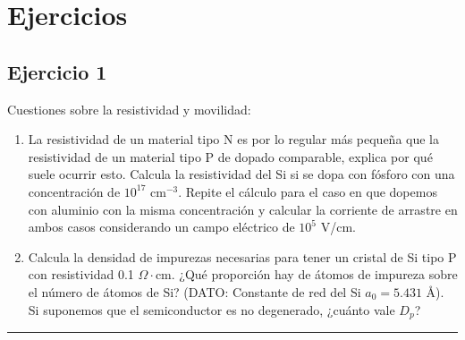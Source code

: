 \newpage




\section{Ejercicios}

\subsection{Ejercicio 1}

Cuestiones sobre la resistividad y movilidad:
\begin{enumerate}[label=\alph*)]
	\item La resistividad de un material tipo N es por lo regular más pequeña que la resistividad de un material tipo P de dopado comparable, explica por qué suele ocurrir esto. Calcula la resistividad del Si si se dopa con fósforo con una concentración de \( 10^{17} \) cm\(^{-3}\). Repite el cálculo para el caso en que dopemos con aluminio con la misma concentración y calcular la corriente de arrastre en ambos casos considerando un campo eléctrico de \( 10^5 \) V/cm.

	\item Calcula la densidad de impurezas necesarias para tener un cristal de Si tipo P con resistividad 0.1 \(\Omega\cdot\)cm. ¿Qué proporción hay de átomos de impureza sobre el número de átomos de Si?
		  (DATO: Constante de red del Si \( a_0 = 5.431 \) Å). Si suponemos que el semiconductor es no degenerado, ¿cuánto vale \( D_p \)?
\end{enumerate}


\rule{\textwidth}{0.1pt} \\[2pt]


